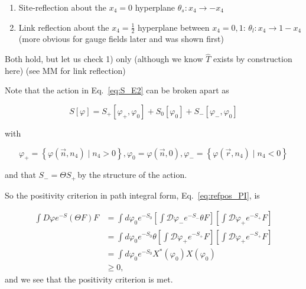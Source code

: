 \begin{itemize}
\begin{enumerate}
  \item Site-reflection about the \(x_{4}=0\) hyperplane $\theta_s: x_4 \rightarrow - x_4$
  \item Link reflection about the $x_4 = \frac{1}{2}$ hyperplane between $x_4 = 0,1$: $\theta_l: x_4 \rightarrow 1 - x_4$ (more obvious for gauge fields later and was shown first)
\end{enumerate}


Both hold, but let us check 1) only (although we know \(\hat{T}\) exists by construction here) (see MM for link reflection)

Note that the action in Eq.~\eqref{eq:S_E2} can be broken apart as

\begin{equation}
S[\varphi]=S_{+}\left[\varphi_{+}, \varphi_{0}\right]+S_{0}\left[\varphi_{0}\right]+S_{-}\left[\varphi_{-}, \varphi_{0}\right]
\end{equation}

with

\begin{equation}
\varphi_{+}=\left\{\varphi\left(\vec{n}, n_{4}\right) \mid n_{4}>0\right\}, \varphi_{0}=\varphi(\vec{n}, 0), \varphi_{-}=\left\{\varphi\left(\vec{r}, n_{4}\right) \mid n_{4}<0\right\}
\end{equation}

and that \(S_{-}=\Theta S_{+}\,\)by the structure of the action.

So the positivity criterion in path integral form, Eq.~\eqref{eq:refpos_PI}, is

\begin{equation}
\begin{aligned}
\int D \varphi e^{-S}(\Theta F) F & =\int d \varphi_{0} e^{-S_{0}}\left[\int \mathcal{D} \varphi_{-} e^{-S_{-}} \theta F\right]\left[\int \mathcal{D} \varphi_{+} e^{-S_{+}} F\right] \\
& =\int d \varphi_{0} e^{-S_{0}} \theta\left[\int \mathcal{D} \varphi_{+} e^{-S_{+}} F\right]\left[\int\mathcal{D} \varphi_{+} e^{-S_{+}} F\right] \\
& =\int d \varphi_{0} e^{-S_{0}} X^{*}\left(\varphi_{0}\right) X\left(\varphi_{0}\right) \\
& \geqslant 0,
\end{aligned}
\end{equation}
and we see that the positivity criterion is met.


\end{itemize}
